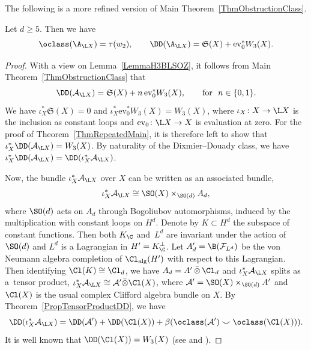 The following is a more refined version of Main Theorem~\ref{ThmObstructionClass}.

\begin{Theorem} \label{ThmRepeatedMain}
Let $d\geq 5$. Then we have
\begin{equation*}
\oclass(\A_{\L X}) = \tau(w_2), \qquad \DD(\A_{\L X}) = \mathfrak{S}(X) + \mathrm{ev}_0^*W_3(X).
\end{equation*}
\end{Theorem}

\begin{proof}
With a view on Lemma~\ref{LemmaH3BLSOZ}, it follows from Main Theorem~\ref{ThmObstructionClass} that
\begin{equation*}
\DD(\mathcal{A}_{\L X}) = \mathfrak{S}(X) + n \, \mathrm{ev}_0^*W_3(X), \qquad \text{for}~~n \in \{0, 1\}.
\end{equation*}
We have $\iota_X^* \mathfrak{S}(X) = 0$ and $\iota_X^*\mathrm{ev}_0^*W_3(X) = W_3(X)$, where $\iota_X \colon X \to \L X$ is the inclusion as constant loops and $\mathrm{ev}_0 \colon \L X \to X$ is evaluation at zero.
For the proof of Theorem~\ref{ThmRepeatedMain}, it is therefore left to show that $\iota_X^* \DD(\mathcal{A}_{\L X}) = W_3(X)$.
By naturality of the Dixmier--Douady class, we have $\iota_X^* \DD(\mathcal{A}_{\L X}) = \DD(\iota_X^*\mathcal{A}_{\L X})$.

Now, the bundle $\iota_X^*\mathcal{A}_{\L X}$ over $X$ can be written as an associated bundle,
\begin{equation*}
 \iota_X^*\mathcal{A}_{\L X} \cong \SO(X) \times_{\SO(d)} A_d,
\end{equation*}
where $\SO(d)$ acts on $A_d$ through Bogoliubov automorphisms, induced by the multiplication with constant loops on $H^d$.
Denote by $K\subset H^d$ the subspace of constant functions.
Then both $K_\C$ and~$L^d$ are invariant under the action of $\SO(d)$ and $L^d$ is a Lagrangian in $H^\prime = K_\C^\perp$.
Let $A_d^\prime = \B(\mathcal{F}_{L^d})$ be the von Neumann algebra completion of $\Cl_{\mathrm{alg}}(H^\prime)$ with respect to this Lagrangian.
Then identifying $\Cl(K) \cong \Cl_d$, we have $A_d = A^\prime \,\bar{\otimes}\, \Cl_d$ and $\iota_X^*\mathcal{A}_{\L X}$ splits as a~tensor product, $\iota_X^*\mathcal{A}_{\L X} \cong \mathcal{A}^\prime \bar{\otimes}\Cl(X)$, where $\mathcal{A}^\prime = \SO(X) \times_{\SO(d)} A^\prime$ and $\Cl(X)$ is the usual complex Clifford algebra bundle on $X$.
By Theorem~\ref{PropTensorProductDD}, we have
\begin{equation*}
 \DD(\iota_X^*\mathcal{A}_{\L X}) = \DD(\mathcal{A}^\prime) + \DD(\Cl(X)) + \beta(\oclass(\mathcal{A}^\prime) \smile \oclass(\Cl(X))).
\end{equation*}
It is well known that $\DD(\Cl(X)) = W_3(X)$ (see \cite[Lemma~7]{DonovanKaroubi} and \cite{MathaiMelroseSingerProjectiveFamilies}).


\end{proof}

